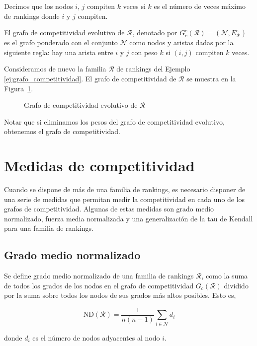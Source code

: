\begin{defi}
Decimos que los nodos $i$, $j$ compiten $k$ veces si $k$ es el número de veces máximo de rankings donde $i$ y $j$ compiten.
\end{defi}

\begin{defi}
El grafo de competitividad evolutivo de $\mathcal{R}$, denotado por $G_c^e(\mathcal{R}) = (\mathcal{N}, E_\mathcal{R}^e)$ es el grafo ponderado con el conjunto $\mathcal{N}$ como nodos y aristas dadas por la siguiente regla: hay una arista entre $i$ y $j$ con peso $k$ si $(i,j)$ compiten $k$ veces.
\end{defi}

\begin{ejemplo}
Consideramos de nuevo la familia $\mathcal{R}$ de rankings del Ejemplo \ref{ej:grafo_competitividad}. El grafo de competitividad de $\mathcal{R}$ se muestra en la Figura~\ref{fig:grafo_competitividad_evolutivo}.

\begin{figure}[htb]
\centering
\ejemplografocompetitividadevolutivo
\caption[Grafo de competitividad evolutivo]{Grafo de competitividad evolutivo de $\mathcal{R}$}
\label{fig:grafo_competitividad_evolutivo}
\end{figure}

\end{ejemplo}

Notar que si eliminamos los pesos del grafo de competitividad evolutivo, obtenemos el grafo de competitividad.

\section{Medidas de competitividad}

Cuando se dispone de más de una familia de rankings, es necesario disponer de una serie de medidas que permitan medir la competitividad en cada uno de los grafos de competitividad. Algunas de estas medidas son grado medio normalizado, fuerza media normalizada y una generalización de la tau de Kendall para una familia de rankings.

\subsection*{Grado medio normalizado}

\begin{defi}
Se define grado medio normalizado de una familia de rankings $\mathcal{R}$, como la suma de todos los grados de los nodos en el grafo de competitividad $G_c(\mathcal{R})$ dividido por la suma sobre todos los nodos de sus grados más altos posibles. Esto es,

\begin{equation}
\mathrm{ND}(\mathcal{R}) = \dfrac{1}{n(n-1)} \sum_{i \in \mathcal{N}} d_i
\end{equation}

donde $d_i$ es el número de nodos adyacentes al nodo  $i$.
\end{defi}

